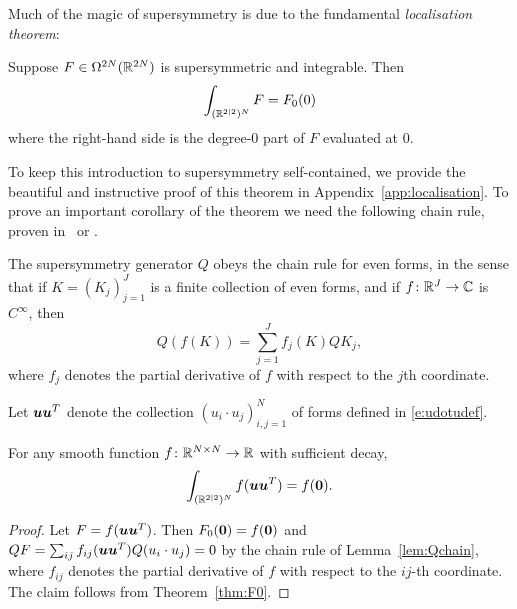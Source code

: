 \documentclass[11pt,a4paper]{article}
\begin{document}
Much of the magic of supersymmetry is due to the fundamental
\emph{localisation theorem}:

\begin{theorem} \label{thm:F0}
  Suppose $F \in\Omega^{2N}(\mathbb{R}^{2N})$ is supersymmetric and integrable. Then
  \begin{equation}
    \int_{(\mathbb{R}^{2|2})^{N}} F = F_0(0)
  \end{equation}
  where the right-hand side is the degree-$0$ part of $F$ evaluated at $0$.
\end{theorem}

To keep this introduction to supersymmetry self-contained, we provide
the beautiful and instructive proof of this theorem in
Appendix~\ref{app:localisation}. To prove an important
corollary of the theorem we need the following chain rule, proven
in~\cite[p.59]{MR1843511} or \cite[Solution to Exercise~11.4.3]{rg-brief}.

\begin{lemma}
\label{lem:Qchain}
The supersymmetry generator $Q$ obeys the chain rule for even forms,
in the sense that if $K = (K_j)_{j=1}^{J}$ is a finite collection of
even forms, and if $f \colon \mathbb{R}^J \to \mathbb{C}$ is $C^\infty$, then
\begin{equation}
 \label{e:Qcr}
     Q(f(K)) = \sum_{j=1}^J f_j(K) QK_{j},
\end{equation}
where $f_j$ denotes the partial derivative of $f$ with respect to the
$j$th coordinate.
\end{lemma}

Let $\boldsymbol{u}\boldsymbol{u}^{T}$ denote
the collection $(u_{i}\cdot u_{j})_{i,j=1}^{N}$ of forms defined in \eqref{e:udotudef}.

\begin{corollary}
  \label{cor:localisation}
  For any smooth function
  $f\colon \mathbb{R}^{N\times N} \to \mathbb{R}$ with sufficient decay,
  \begin{equation}
    \int_{(\mathbb{R}^{2|2})^{N}} f(\boldsymbol{u}\boldsymbol{u}^T) = f(\boldsymbol{0}).
  \end{equation}
\end{corollary}
\begin{proof}
  Let $F = f(\boldsymbol{u}\boldsymbol{u}^T)$. Then $F_0(\boldsymbol{0}) = f(\boldsymbol{0})$ and
  $QF = \sum_{ij} f_{ij}(\boldsymbol{u}\boldsymbol{u}^T) Q(u_i\cdot u_j) = 0$ by the
  chain rule of Lemma~\ref{lem:Qchain}, 
  where $f_{ij}$ denotes the partial derivative of $f$ with respect
  to the $ij$-th coordinate.  The claim follows from
  Theorem~\ref{thm:F0}.
\end{proof}
\end{document}
